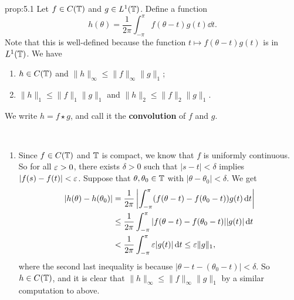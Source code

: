 \begin{prop}{prop:5.1}
    Let $f \in C(\mathbb{T})$ and $g \in L^1(\mathbb{T})$. Define a function 
    \[ h(\theta) = \frac{1}{2\pi} \int_{-\pi}^\pi f(\theta - t) g(t)\dd t. \] 
    Note that this is well-defined because the function 
    $t \mapsto f(\theta - t) g(t)$ is in $L^1(\mathbb{T})$. We have 
    \begin{enumerate}[(1)]
        \item $h \in C(\mathbb{T})$ and $\|h\|_\infty \leq \|f\|_\infty \|g\|_1$; 
        \item $\|h\|_1 \leq \|f\|_1 \|g\|_1$ and $\|h\|_2 \leq \|f\|_2 \|g\|_1$. 
    \end{enumerate}
    We write $h = f \star g$, and call it the {\bf convolution} of $f$ and $g$. 
\end{prop}
\begin{pf}~
    \begin{enumerate}[(1)]
        \item Since $f \in C(\mathbb{T})$ and $\mathbb{T}$ is compact, we know that $f$ 
        is uniformly continuous. So for all $\varepsilon > 0$, there exists 
        $\delta > 0$ such that $|s - t| < \delta$ implies 
        $|f(s) - f(t)| < \varepsilon$. Suppose that $\theta, \theta_0 \in \mathbb{T}$ with 
        $|\theta - \theta_0| < \delta$. We get 
        \begin{align*}
            |h(\theta) - h(\theta_0)| 
            &= \frac{1}{2\pi} \left| \int_{-\pi}^\pi (f(\theta - t) - f(\theta_0 - t)) g(t)\,\mathrm{d} t \right| \\ 
            &\leq \frac{1}{2\pi} \int_{-\pi}^\pi |f(\theta - t) - f(\theta_0 - t)| |g(t)|\,\mathrm{d} t \\ 
            &< \frac{1}{2\pi} \int_{-\pi}^\pi \varepsilon |g(t)|\,\mathrm{d} t \leq \varepsilon\|g\|_1, 
        \end{align*}
        where the second last inequality is because $|\theta - t - (\theta_0 - t)| < \delta$. 
        So $h \in C(\mathbb{T})$, and it is clear that $\|h\|_\infty \leq 
        \|f\|_\infty \|g\|_1$ by a similar computation to above. 


\end{enumerate}
\end{pf}
